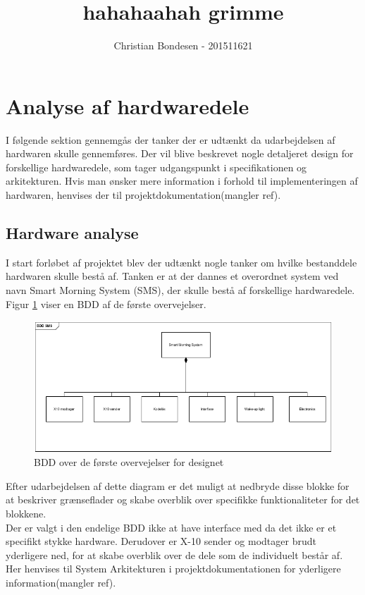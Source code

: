 \documentclass[11pt]{article}
\title{hahahaahah grimme}
\author{Christian Bondesen - 201511621}
\begin{document}
\maketitle
\section{Analyse af hardwaredele}
I følgende sektion gennemgås der tanker der er udtænkt da udarbejdelsen af hardwaren skulle gennemføres. Der vil blive beskrevet nogle detaljeret design for forskellige hardwaredele, som tager udgangspunkt i specifikationen og arkitekturen. Hvis man ønsker mere information i forhold til implementeringen af hardwaren, henvises der til projektdokumentation(mangler ref).

\subsection*{Hardware analyse}
I start forløbet af projektet blev der udtænkt nogle tanker om hvilke bestanddele hardwaren skulle bestå af. Tanken er at der dannes et overordnet system ved navn Smart Morning System (SMS), der skulle bestå af forskellige hardwaredele. Figur \ref{fig:overvejelserBDD} viser en BDD af de første overvejelser. 

	\begin{figure}[!ht]
	 	\centering
	 	\includegraphics[scale = 0.8]{BDD-overvejelser-SMS}
	 	\caption{BDD over de første overvejelser for designet}
	 	\label{fig:overvejelserBDD}
	 \end{figure} 

Efter udarbejdelsen af dette diagram er det muligt at nedbryde disse blokke for at beskriver grænseflader og skabe overblik over specifikke funktionaliteter for det blokkene.\\
Der er valgt i den endelige BDD ikke at have interface med da det ikke er et specifikt stykke hardware. Derudover er X-10 sender og modtager brudt yderligere ned, for at skabe overblik over de dele som de individuelt består af. Her henvises til System Arkitekturen i projektdokumentationen for yderligere information(mangler ref).
\end{document}
